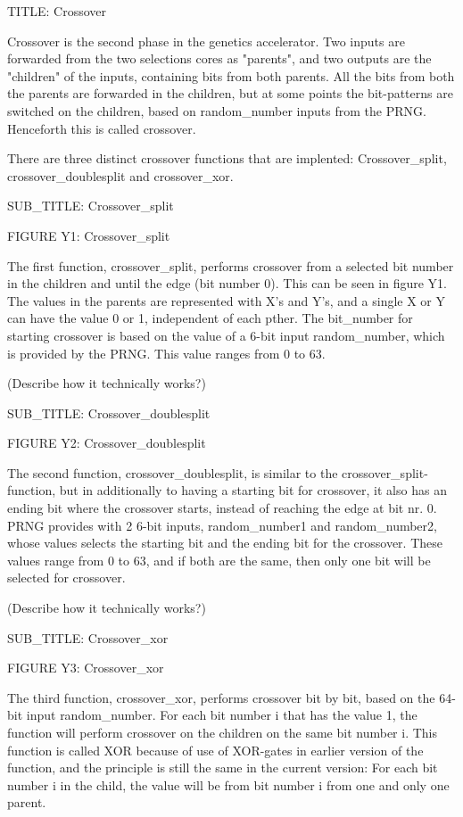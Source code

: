 TITLE: Crossover

Crossover is the second phase in the genetics accelerator. Two inputs are forwarded from the two selections cores as "parents", and two outputs are the "children" of the inputs, containing bits from both parents. All the bits from both the parents are forwarded in the children, but at some points the bit-patterns are switched on the children, based on random_number inputs from the PRNG. Henceforth this is called crossover.

There are three distinct crossover functions that are implented: Crossover_split, crossover_doublesplit and crossover_xor.

SUB_TITLE: Crossover_split 

FIGURE Y1: Crossover_split

The first function, crossover_split, performs crossover from a selected bit number in the children and until the edge (bit number 0). This can be seen in figure Y1. The values in the parents are represented with X's and Y's, and a single X or Y can have the value 0 or 1, independent of each pther.
The bit_number for starting crossover is based on the value of a 6-bit input random_number, which is provided by the PRNG. This value ranges from 0 to 63.

(Describe how it technically works?)

SUB_TITLE: Crossover_doublesplit

FIGURE Y2: Crossover_doublesplit

The second function, crossover_doublesplit, is similar to the crossover_split-function, but in additionally to having a starting bit for crossover, it also has an ending bit where the crossover starts, instead of reaching the edge at bit nr. 0. PRNG provides with 2 6-bit inputs, random_number1 and random_number2, whose values selects the starting bit and the ending bit for the crossover. These values range from 0 to 63, and if both are the same, then only one bit will be selected for crossover.

(Describe how it technically works?)

SUB_TITLE: Crossover_xor

FIGURE Y3:  Crossover_xor

The third function, crossover_xor, performs crossover bit by bit, based on the 64-bit input random_number. For each bit number i that has the value 1, the function will perform crossover on the children on the same bit number i. This function is called XOR because of use of XOR-gates in earlier version of the function, and the principle is still the same in the current version: For each bit number i in the child, the value will be from bit number i from one and only one parent.

